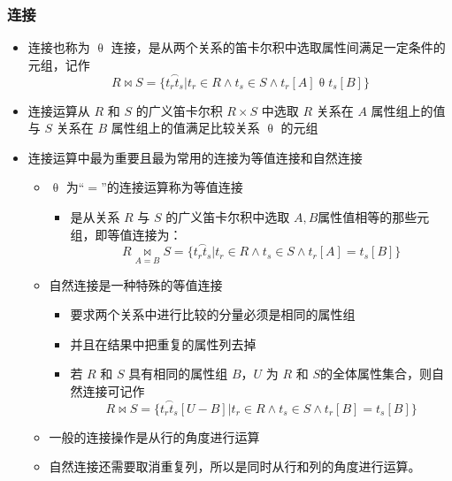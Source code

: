 \subsubsection{连接}
\begin{itemize}
    \item 连接也称为 $\uptheta$ 连接，是从两个关系的笛卡尔积中选取属性间满足一定条件的元组，记作
    $$R \bowtie S =\{\overset{\frown}{t_rt_s} |t_r \in R \wedge t_s \in S \wedge t_r[A]\uptheta t_s[B]\}$$
    \item 连接运算从 $R$ 和 $S$ 的广义笛卡尔积 $R\times S$ 中选取 $R$ 关系在 $A$ 属性组上的值与 $S$ 关系在 $B$ 属性组上的值满足比较关系 $\uptheta$ 的元组
    \item 连接运算中最为重要且最为常用的连接为等值连接和自然连接
    \begin{itemize}
        \item $\uptheta$ 为“$=$”的连接运算称为等值连接
        \begin{itemize}
            \item 是从关系 $R$ 与 $S$ 的广义笛卡尔积中选取 $A,B$​ 属性值相等的那些元组，即等值连接为：
            $$R \mathop\bowtie \limits_{A=B} S =\{\overset{\frown}{t_rt_s} |t_r \in R \wedge t_s \in S \wedge t_r[A]= t_s[B]\}$$
        \end{itemize}
        \item 自然连接是一种特殊的等值连接
        \begin{itemize}
            \item 要求两个关系中进行比较的分量必须是相同的属性组
            \item 并且在结果中把重复的属性列去掉
            \item 若 $R$ 和 $S$ 具有相同的属性组 $B$，$U$ 为 $R$ 和 $S$​ 的全体属性集合，则自然连接可记作
            $$R \bowtie S =\{\overset{\frown}{t_rt_s}[U-B] |t_r \in R \wedge t_s \in S \wedge t_r[B]= t_s[B]\}$$
        \end{itemize}
        \item 一般的连接操作是从行的角度进行运算
        \item 自然连接还需要取消重复列，所以是同时从行和列的角度进行运算。
    \end{itemize}
\end{itemize}

